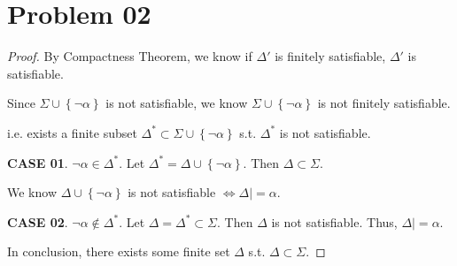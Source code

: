 \documentclass{article}
\newcommand{\set}[1]{\left\{#1\right\}}
\begin{document}
\section{Problem 02}
\vspace{1em}
\begin{proof}
    By Compactness Theorem, we know if $\Delta'$ is finitely satisfiable, $\Delta'$ is satisfiable.

    \hspace{1.3em}
    Since $\Sigma\cup\set{\neg\alpha}$ is not satisfiable, we know $\Sigma\cup\set{\neg\alpha}$ is not finitely satisfiable.

    \hspace{1.3em}
    i.e. exists a finite subset $\Delta^*\subset\Sigma\cup\set{\neg\alpha}$ s.t. $\Delta^*$ is not satisfiable.

    \hspace{1.3em}
    \textbf{CASE 01}. $\neg\alpha\in\Delta^*$. Let $\Delta^*=\Delta\cup\set{\neg\alpha}$. Then $\Delta\subset\Sigma$. 
    
    \hspace{6.6em}
    We know $\Delta\cup\set{\neg\alpha}$ is not satisfiable $\Longleftrightarrow \Delta|\!\!\!=\alpha$.

    \hspace{1.3em}
    \textbf{CASE 02}. $\neg\alpha\notin\Delta^*$. Let $\Delta=\Delta^*\subset\Sigma$. Then $\Delta$ is not satisfiable. Thus, $\Delta|\!\!\!=\alpha$.

    \hspace{1.3em}
    In conclusion, there exists some finite set $\Delta$ s.t. $\Delta\subset\Sigma$.
\end{proof}

\vspace{1em}
\end{document}
